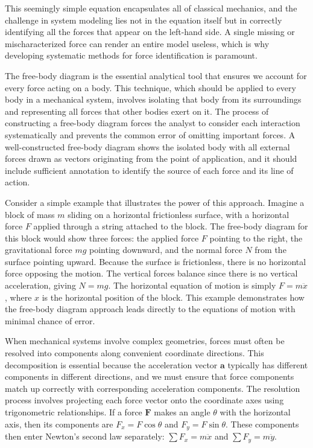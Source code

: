 This seemingly simple equation encapsulates all of classical mechanics, and the challenge in system modeling lies not in the equation itself but in correctly identifying all the forces that appear on the left-hand side. A single missing or mischaracterized force can render an entire model useless, which is why developing systematic methods for force identification is paramount.

The free-body diagram is the essential analytical tool that ensures we account for every force acting on a body. This technique, which should be applied to every body in a mechanical system, involves isolating that body from its surroundings and representing all forces that other bodies exert on it. The process of constructing a free-body diagram forces the analyst to consider each interaction systematically and prevents the common error of omitting important forces. A well-constructed free-body diagram shows the isolated body with all external forces drawn as vectors originating from the point of application, and it should include sufficient annotation to identify the source of each force and its line of action.

Consider a simple example that illustrates the power of this approach. Imagine a block of mass $m$ sliding on a horizontal frictionless surface, with a horizontal force $F$ applied through a string attached to the block. The free-body diagram for this block would show three forces: the applied force $F$ pointing to the right, the gravitational force $mg$ pointing downward, and the normal force $N$ from the surface pointing upward. Because the surface is frictionless, there is no horizontal force opposing the motion. The vertical forces balance since there is no vertical acceleration, giving $N = mg$. The horizontal equation of motion is simply $F = m\ddot{x}$, where $x$ is the horizontal position of the block. This example demonstrates how the free-body diagram approach leads directly to the equations of motion with minimal chance of error.

When mechanical systems involve complex geometries, forces must often be resolved into components along convenient coordinate directions. This decomposition is essential because the acceleration vector $\mathbf{a}$ typically has different components in different directions, and we must ensure that force components match up correctly with corresponding acceleration components. The resolution process involves projecting each force vector onto the coordinate axes using trigonometric relationships. If a force $\mathbf{F}$ makes an angle $\theta$ with the horizontal axis, then its components are $F_x = F\cos\theta$ and $F_y = F\sin\theta$. These components then enter Newton's second law separately: $\sum F_x = m\ddot{x}$ and $\sum F_y = m\ddot{y}$.

